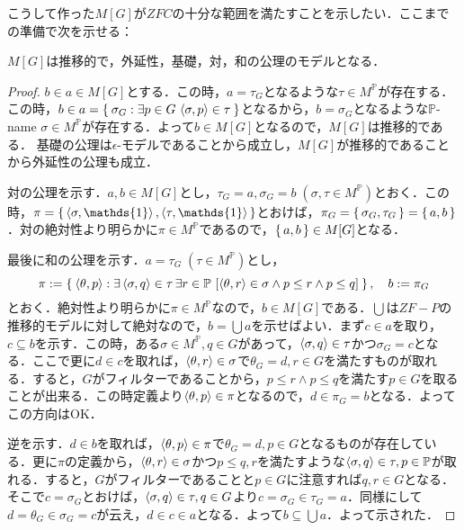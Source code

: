 \documentclass[a4j]{bxjsarticle}
\begin{document}
こうして作った$M[G]$が$ZFC$の十分な範囲を満たすことを示したい．ここまでの準備で次を示せる：
\begin{lemma}
 $M[G]$は推移的で，外延性，基礎，対，和の公理のモデルとなる．
\end{lemma}
\begin{proof}
 $b \in a \in M[G]$とする．この時，$a = \tau_G$となるような$\tau \in M^\mathbb{P}$が存在する．この時，$b \in a = \Set{ \sigma_G : \exists p \in G\, \braket{\sigma, p} \in \tau}$となるから，$b = \sigma_G$となるような$\mathbb{P}$-name $\sigma\in M^\mathbb{P}$が存在する．よって$b \in M[G]$となるので，$M[G]$は推移的である．
 基礎の公理は$\epsilon$-モデルであることから成立し，$M[G]$が推移的であることから外延性の公理も成立．

 対の公理を示す．$a, b \in M[G]$とし，$\tau_G = a, \sigma_G = b\;(\sigma, \tau \in M^\mathbb{P})$とおく．この時，$\pi = \set{\braket{\sigma, \mathds{1}}, \braket{\tau, \mathds{1}}}$とおけば，$\pi_G = \set{\sigma_G, \tau_G} = \set{a, b}$．対の絶対性より明らかに$\pi \in M^\mathbb{P}$であるので，$\set{a, b} \in M[G]$となる．

 最後に和の公理を示す．$a = \tau_G\; (\tau \in M^\mathbb{P})$とし，
 \[
  \pi \mathrel{:=} \Set{ \braket{\theta, p} : \exists \braket{\sigma, q} \in \tau\, \exists r \in \mathbb{P}\, \left[\braket{\theta, r} \in \sigma \wedge p \leq r \wedge p \leq q \right]}, \quad b \mathrel{:=} \pi_G
 \]
 とおく．絶対性より明らかに$\pi \in M^\mathbb{P}$なので，$b \in M[G]$である．$\bigcup$は$ZF-P$の推移的モデルに対して絶対なので，$b = \bigcup a$を示せばよい．まず$c \in a$を取り，$c \subseteq b$を示す．この時，ある$\sigma \in M^\mathbb{P}, q \in G$があって，$\braket{\sigma, q} \in \tau$かつ$\sigma_G = c$となる．ここで更に$d \in c$を取れば，$\braket{\theta, r} \in \sigma$で$\theta_G = d, r \in G$を満たすものが取れる．すると，$G$がフィルターであることから，$p \leq r \wedge p \leq q$を満たす$p \in G$を取ることが出来る．この時定義より$\braket{\theta, p} \in \pi$となるので，$d \in \pi_G = b$となる．よってこの方向はOK．

 逆を示す．$d \in b$を取れば，$\braket{\theta, p} \in \pi$で$\theta_G = d, p \in G$となるものが存在している．更に$\pi$の定義から，$\braket{\theta, r} \in \sigma$かつ$p \leq q, r$を満たすような$\braket{\sigma, q} \in \tau, p \in \mathbb{P}$が取れる．すると，$G$がフィルターであることと$p \in G$に注意すれば$q, r \in G$となる．そこで$c = \sigma_G$とおけば，$\braket{\sigma, q} \in \tau, q \in G$より$c = \sigma_G \in \tau_G = a$．同様にして$d = \theta_G \in \sigma_G = c$が云え，$d \in c \in a$となる．よって$b \subseteq \bigcup a$．よって示された．
 \mbox{}
\end{proof}
\nocite{Kunen:2011,Eda:2010,Arai:2011}
\printbibliography[title=参考文献]
\end{document}
